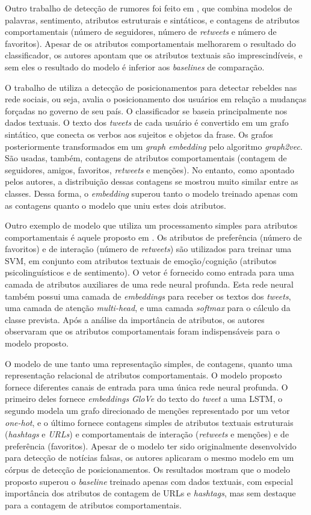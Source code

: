 \documentclass[
	12pt, oneside, a4paper, english, brazil
]{abntex2ppgsi}
\begin{document}
Outro trabalho de detecção de rumores foi feito em , que combina modelos de palavras, sentimento, atributos estruturais e sintáticos, e contagens de atributos comportamentais (número de seguidores, número de {\em retweets} e número de favoritos).  Apesar de os atributos comportamentais melhorarem o resultado do classificador, os autores apontam que os atributos textuais são imprescindíveis, e sem eles o resultado do modelo é inferior aos {\em baselines} de comparação.

O trabalho de  utiliza a detecção de posicionamentos para detectar rebeldes nas rede sociais, ou seja, avalia o posicionamento dos usuários em relação a mudanças forçadas no governo de seu país. O classificador se baseia principalmente nos dados textuais. O texto dos {\em tweets} de cada usuário é convertido em um grafo sintático, que conecta os verbos aos sujeitos e objetos da frase. Os grafos posteriormente transformados em um {\em graph embedding} pelo algoritmo {\em graph2vec}. São usadas, também, contagens de atributos comportamentais (contagem de seguidores, amigos, favoritos, {\em retweets} e menções). No entanto, como apontado pelos autores, a distribuição dessas contagens se mostrou muito similar entre as classes. Dessa forma, o {\em embedding} superou tanto o modelo treinado apenas com as contagens quanto o modelo que uniu estes dois atributos.

Outro exemplo de modelo que utiliza um processamento simples para atributos comportamentais é aquele proposto em . Os atributos de preferência (número de favoritos) e de interação (número de {\em retweets}) são utilizados para treinar uma SVM, em conjunto com atributos textuais de emoção/cognição (atributos psicolinguísticos e de sentimento). O vetor é fornecido como entrada para uma camada de atributos auxiliares de uma rede neural profunda. Esta rede neural também possui uma camada de {\em embeddings} para receber os textos dos {\em tweets}, uma camada de atenção {\em multi-head}, e uma camada {\em softmax} para o cálculo da classe prevista. Após a análise da importância de atributos, os autores observaram que os atributos comportamentais foram indispensáveis para o modelo proposto. 

O modelo de  une tanto uma representação simples, de contagens, quanto uma representação relacional de atributos comportamentais. O modelo proposto fornece diferentes canais de entrada para uma única rede neural profunda. O primeiro deles fornece {\em embeddings} {\em GloVe} do texto do {\em tweet} \cite{glove} a uma LSTM, o segundo modela um grafo direcionado de menções representado por um vetor {\em one-hot}, e o último fornece contagens simples de atributos textuais estruturais ({\em hashtags} e {\em URLs}) e comportamentais de interação ({\em retweets} e menções) e de preferência (favoritos). Apesar de o modelo ter sido originalmente desenvolvido para detecção de notícias falsas, os autores aplicaram o mesmo modelo em um córpus de detecção de posicionamentos. Os resultados mostram que o modelo proposto superou o {\em baseline} treinado apenas com dados textuais, com especial importância dos atributos de contagem de URLs e {\em hashtags}, mas sem destaque para a contagem de atributos comportamentais.
\end{document}
